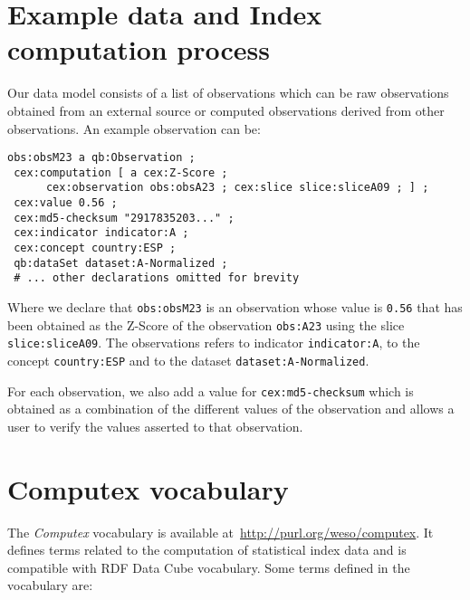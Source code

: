 \section{Example data and Index computation process}

Our data model consists of a list of observations which can be raw observations
obtained from an external source or computed observations derived from other
observations. An example observation can be:

\begin{lstlisting}[style=SPARQL]
obs:obsM23 a qb:Observation ;
 cex:computation [ a cex:Z-Score ; 
      cex:observation obs:obsA23 ; cex:slice slice:sliceA09 ; ] ;
 cex:value 0.56 ;
 cex:md5-checksum "2917835203..." ;
 cex:indicator indicator:A ;
 cex:concept country:ESP ;
 qb:dataSet dataset:A-Normalized ;
 # ... other declarations omitted for brevity
\end{lstlisting}

Where we declare that \lstinline|obs:obsM23| is an observation
 whose value is \lstinline|0.56| that has been obtained as the Z-Score
 of the observation \lstinline|obs:A23| using the slice
 \lstinline|slice:sliceA09|. The observations refers to indicator
 \lstinline|indicator:A|, to the concept \lstinline|country:ESP| and to the
 dataset \lstinline|dataset:A-Normalized|.
 
For each observation, we also add a value for 
\lstinline|cex:md5-checksum| which is obtained as a combination of the 
different values of the observation and allows a user to verify the
values asserted to that observation.


\section{Computex vocabulary}

The \emph{Computex} vocabulary is available
at~\url{http://purl.org/weso/computex}. It defines terms related to the
computation of statistical index data and is compatible with RDF Data Cube
vocabulary. Some terms defined in the vocabulary are:

